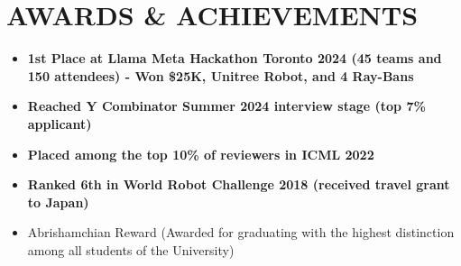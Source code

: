 \section{AWARDS \& ACHIEVEMENTS}
\begin{minipage}{\maincolumnwidth}%
	\small{
    	\begin{itemize}
            \item \textbf{1st Place at Llama Meta Hackathon Toronto 2024 (45 teams and 150 attendees) - Won \$25K, Unitree Robot, and 4 Ray-Bans}
            \item \textbf{Reached Y Combinator Summer 2024 interview stage (top 7\% applicant)}
                \item \textbf{Placed among the \textbf{top 10\% of reviewers} in ICML 2022}
    			\item \textbf{Ranked 6th in World Robot Challenge 2018 (received travel grant to Japan)}%
    	    \item {Abrishamchian Reward (Awarded for graduating with the highest distinction among all students of the University)}


\end{itemize}}
\end{minipage}
